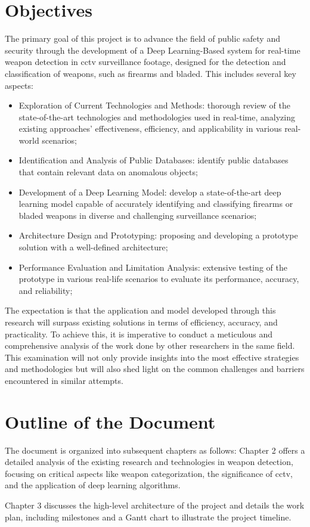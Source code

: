 \section{Objectives}
The primary goal of this project is to advance the field of public safety and security through the development of a Deep Learning-Based system for real-time weapon detection in \ac{cctv} surveillance footage, designed for the detection and classification of weapons, such as firearms and bladed. This includes several key aspects:
\begin{itemize}
    \item Exploration of Current Technologies and Methods: thorough review of the state-of-the-art technologies and methodologies used in real-time, analyzing existing approaches' effectiveness, efficiency, and applicability in various real-world scenarios;
    \item Identification and Analysis of Public Databases: identify public databases that contain relevant data on anomalous objects;
    \item Development of a Deep Learning Model: develop a state-of-the-art deep learning model capable of accurately identifying and classifying firearms or bladed weapons in diverse and challenging surveillance scenarios;
    \item Architecture Design and Prototyping: proposing and developing a prototype solution with a well-defined architecture;
    \item Performance Evaluation and Limitation Analysis: extensive testing of the prototype in various real-life scenarios to evaluate its performance, accuracy, and reliability;
\end{itemize}

The expectation is that the application and model developed through this research will surpass existing solutions in terms of efficiency, accuracy, and practicality. To achieve this, it is imperative to conduct a meticulous and comprehensive analysis of the work done by other researchers in the same field. This examination will not only provide insights into the most effective strategies and methodologies but will also shed light on the common challenges and barriers encountered in similar attempts.  
\section{Outline of the Document}
The document is organized into subsequent chapters as follows: Chapter 2 offers a detailed analysis of the existing research and technologies in weapon detection, focusing on critical aspects like weapon categorization, the significance of \ac{cctv}, and the application of deep learning algorithms. 

Chapter 3 discusses the high-level architecture of the project and details the work plan, including milestones and a Gantt chart to illustrate the project timeline.